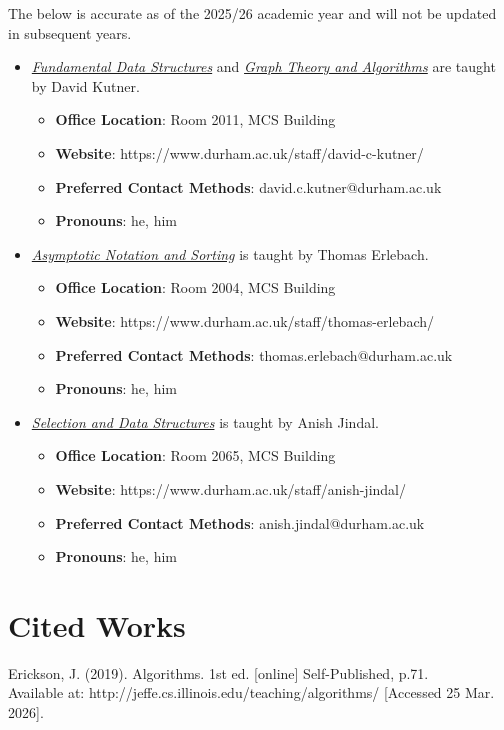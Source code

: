 \documentclass{article}
\begin{document}
The below is accurate as of the 2025/26 academic year and will not be updated in subsequent years.
\begin{itemize}
    \item \hyperref[part:1.fds]{\textit{Fundamental Data Structures}} and \hyperref[part:4.gta]{\textit{Graph Theory and Algorithms}} are taught by David Kutner.
    \begin{itemize}
        \item \textbf{Office Location}: Room 2011, MCS Building
        \item \textbf{Website}: https://www.durham.ac.uk/staff/david-c-kutner/
        \item \textbf{Preferred Contact Methods}: david.c.kutner@durham.ac.uk
        \item \textbf{Pronouns}: he, him
    \end{itemize}
    
    \item \hyperref[part:2.ans]{\textit{Asymptotic Notation and Sorting}} is taught by Thomas Erlebach.
    \begin{itemize}
        \item \textbf{Office Location}: Room 2004, MCS Building
        \item \textbf{Website}: https://www.durham.ac.uk/staff/thomas-erlebach/
        \item \textbf{Preferred Contact Methods}: thomas.erlebach@durham.ac.uk
        \item \textbf{Pronouns}: he, him
    \end{itemize}
    
    \item \hyperref[part:3.sds]{\textit{Selection and Data Structures}} is taught by Anish Jindal.
    \begin{itemize}
        \item \textbf{Office Location}: Room 2065, MCS Building
        \item \textbf{Website}: https://www.durham.ac.uk/staff/anish-jindal/
        \item \textbf{Preferred Contact Methods}: anish.jindal@durham.ac.uk
        \item \textbf{Pronouns}: he, him
    \end{itemize}
\end{itemize}

\section{Cited Works}

Erickson, J. (2019). Algorithms. 1st ed. [online] Self-Published, p.71. \\ Available at: http://jeffe.cs.illinois.edu/teaching/algorithms/ [Accessed 25 Mar. 2026].\label{cit:1.algorithms}
\end{document}
